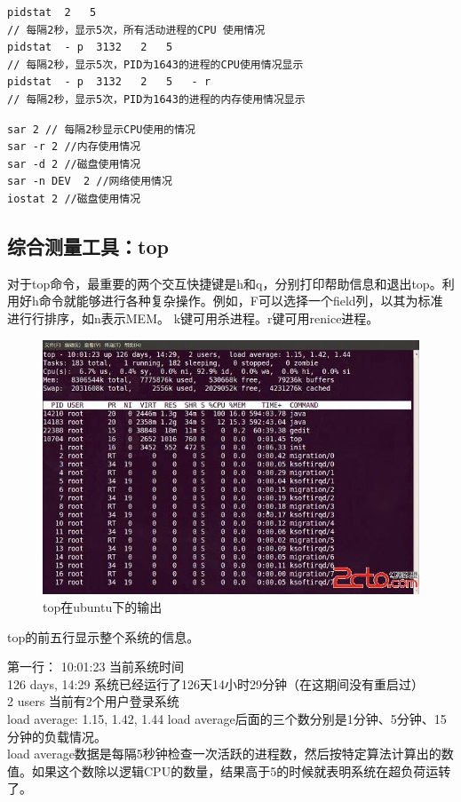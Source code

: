 \begin{verbatim}
pidstat  2   5  
// 每隔2秒，显示5次，所有活动进程的CPU 使用情况 
pidstat  - p  3132   2   5  
// 每隔2秒，显示5次，PID为1643的进程的CPU使用情况显示 
pidstat  - p  3132   2   5   - r
// 每隔2秒，显示5次，PID为1643的进程的内存使用情况显示
\end{verbatim}

\begin{verbatim}
sar 2 // 每隔2秒显示CPU使用的情况										
sar -r 2 //内存使用情况					 
sar -d 2 //磁盘使用情况					 
sar -n DEV  2 //网络使用情况
iostat 2 //磁盘使用情况
\end{verbatim}

\subsection{综合测量工具：top}
对于top命令，最重要的两个交互快捷键是h和q，分别打印帮助信息和退出top。利用好h命令就能够进行各种复杂操作。例如，F可以选择一个field列，以其为标准进行行排序，如n表示MEM。
k键可用杀进程。r键可用renice进程。


\begin{figure}[ht]
	\begin{center}
	\includegraphics[keepaspectratio,width=0.6\paperwidth]{Pictures/topCmdUbuntu.jpg}
		\caption{top在ubuntu下的输出}
	\label{fig:topCmdUbuntu}
	\end{center}
\end{figure}

top的前五行显示整个系统的信息。

第一行：
 10:01:23 当前系统时间\\
 126 days, 14:29 系统已经运行了126天14小时29分钟（在这期间没有重启过）\\
 2 users 当前有2个用户登录系统\\
 load average: 1.15, 1.42, 1.44 load average后面的三个数分别是1分钟、5分钟、15分钟的负载情况。\\
load average数据是每隔5秒钟检查一次活跃的进程数，然后按特定算法计算出的数值。如果这个数除以逻辑CPU的数量，结果高于5的时候就表明系统在超负荷运转了。
  
